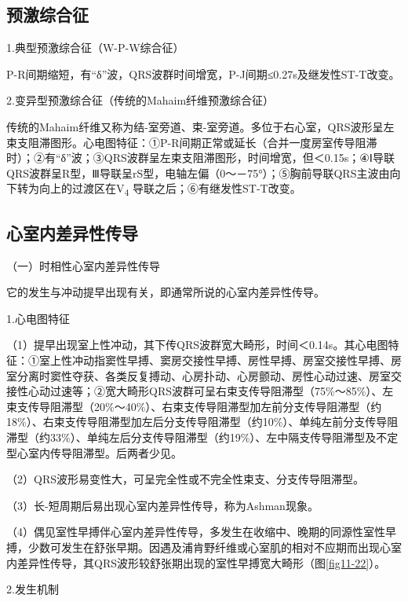 \protect\hypertarget{text00009.htmlux5cux23subid58}{}{}

\subsection{预激综合征}

1.典型预激综合征（W-P-W综合征）

P-R间期缩短，有“δ”波，QRS波群时间增宽，P-J间期≤0.27s及继发性ST-T改变。

2.变异型预激综合征（传统的Mahaim纤维预激综合征）

传统的Mahaim纤维又称为结-室旁道、束-室旁道。多位于右心室，QRS波形呈左束支阻滞图形。心电图特征：①P-R间期正常或延长（合并一度房室传导阻滞时）；②有“δ”波；③QRS波群呈左束支阻滞图形，时间增宽，但＜0.15s；④Ⅰ导联QRS波群呈R型，Ⅲ导联呈rS型，电轴左偏（0～－75°）；⑤胸前导联QRS主波由向下转为向上的过渡区在V\textsubscript{4}
导联之后；⑥有继发性ST-T改变。

\protect\hypertarget{text00009.htmlux5cux23subid59}{}{}

\subsection{心室内差异性传导}

（一）时相性心室内差异性传导

它的发生与冲动提早出现有关，即通常所说的心室内差异性传导。

1.心电图特征

（1）提早出现室上性冲动，其下传QRS波群宽大畸形，时间＜0.14s。其心电图特征：①室上性冲动指窦性早搏、窦房交接性早搏、房性早搏、房室交接性早搏、房室分离时窦性夺获、各类反复搏动、心房扑动、心房颤动、房性心动过速、房室交接性心动过速等；②宽大畸形QRS波群可呈右束支传导阻滞型（75\%～85\%）、左束支传导阻滞型（20\%～40\%）、右束支传导阻滞型加左前分支传导阻滞型（约18\%）、右束支传导阻滞型加左后分支传导阻滞型（约10\%）、单纯左前分支传导阻滞型（约33\%）、单纯左后分支传导阻滞型（约19\%）、左中隔支传导阻滞型及不定型心室内传导阻滞型。后两者少见。

（2）QRS波形易变性大，可呈完全性或不完全性束支、分支传导阻滞型。

（3）长-短周期后易出现心室内差异性传导，称为Ashman现象。

（4）偶见室性早搏伴心室内差异性传导，多发生在收缩中、晚期的同源性室性早搏，少数可发生在舒张早期。因遇及浦肯野纤维或心室肌的相对不应期而出现心室内差异性传导，其QRS波形较舒张期出现的室性早搏宽大畸形（图\ref{fig11-22}）。

2.发生机制

